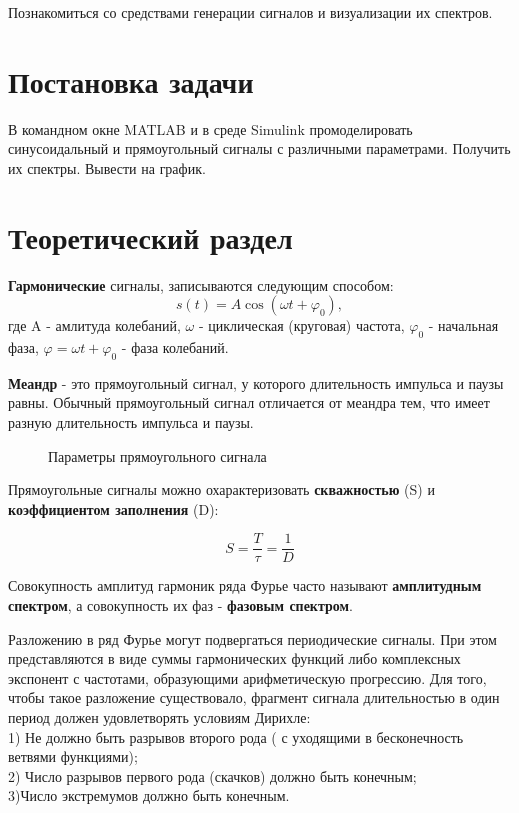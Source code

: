 \documentclass[12pt,a4paper]{scrartcl}
\begin{document}
Познакомиться со средствами генерации сигналов и визуализации их спектров.\\

\section{Постановка задачи}
\label{sec:task}

В командном окне MATLAB и в среде Simulink промоделировать синусоидальный и прямоугольный сигналы с различными параметрами. Получить их спектры. Вывести на график.\\

\section{Теоретический раздел}
\label{sec:teoriya}
\textbf{Гармонические} сигналы, записываются следующим способом:
$$s(t)=A\cos (\omega t+\varphi _0),$$ где  A - амлитуда колебаний, $\omega$ - циклическая (круговая) частота, $\varphi _0$ - начальная фаза, $\varphi = \omega t+\varphi _0$ - фаза колебаний.


\textbf{Меандр} - это прямоугольный сигнал, у которого длительность импульса и паузы равны. Обычный прямоугольный сигнал отличается от меандра тем, что имеет разную длительность импульса и паузы. 

\begin{figure}[h!]
\caption{Параметры прямоугольного сигнала}
\end{figure}

Прямоугольные сигналы можно охарактеризовать \textbf{скважностью} (S) и \textbf{коэффициентом заполнения} (D):

$$S=\frac{T}{\tau}=\frac{1}{D}$$

Совокупность амплитуд гармоник ряда Фурье часто называют \textbf{амплитудным спектром}, а совокупность их фаз - \textbf{фазовым спектром}.

Разложению в ряд Фурье могут подвергаться периодические сигналы. При этом представляются в виде суммы гармонических функций либо комплексных экспонент с частотами, образующими арифметическую прогрессию. Для того, чтобы такое разложение существовало, фрагмент сигнала длительностью в один период должен удовлетворять условиям Дирихле:\\
1) Не должно быть разрывов второго рода ( с уходящими в бесконечность ветвями функциями);\\
2) Число разрывов первого рода (скачков) должно быть конечным;\\
3)Число экстремумов должно быть конечным.
\end{document}
